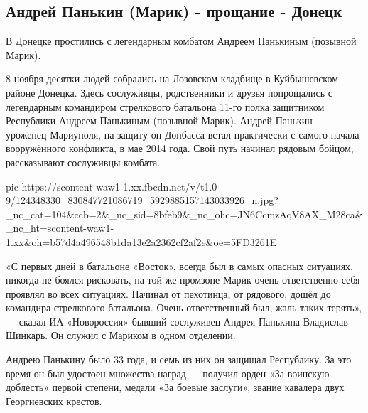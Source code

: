  
 
 

\subsection{Андрей Панькин (Марик) - прощание - Донецк}
\label{sec:08_11_2020.fb.dnr.kiselev_v_evgenii.1.marik_death}


В Донецке простились с легендарным комбатом Андреем Панькиным (позывной Марик).

8 ноября десятки людей собрались на Лозовском кладбище в Куйбышевском районе
Донецка. Здесь сослуживцы, родственники и друзья попрощались с легендарным
командиром стрелкового батальона 11-го полка защитником Республики Андреем
Панькиным (позывной Марик).  Андрей Панькин --- уроженец Мариуполя, на защиту он
Донбасса встал практически с самого начала вооружённого конфликта, в мае 2014
года. Свой путь начинал рядовым бойцом, рассказывают сослуживцы комбата.

\ifcmt
pic https://scontent-waw1-1.xx.fbcdn.net/v/t1.0-9/124348330_830847721086719_5929885157143033926_n.jpg?_nc_cat=104&ccb=2&_nc_sid=8bfeb9&_nc_ohc=JN6CcmzAqV8AX_M28ca&_nc_ht=scontent-waw1-1.xx&oh=b57d4a496548b1da13e2a2362cf2af2e&oe=5FD3261E
\fi

«С первых дней в батальоне «Восток», всегда был в самых опасных ситуациях,
никогда не боялся рисковать, на той же промзоне Марик очень ответственно себя
проявлял во всех ситуациях. Начинал от пехотинца, от рядового, дошёл до
командира стрелкового батальона. Очень ответственный был, жаль таких терять», —
сказал ИА «Новороссия» бывший сослуживец Андрея Панькина Владислав Шинкарь. Он
служил с Мариком в одном отделении.

Андрею Панькину было 33 года, и семь из них он защищал Республику. За это время
он был удостоен множества наград --- получил орден «За воинскую доблесть» первой
степени, медали «За боевые заслуги», звание кавалера двух Георгиевских крестов.

